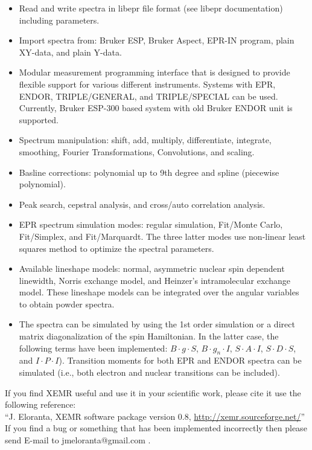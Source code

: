 \documentclass[byrevtex,amssymb,aps,pra,floatfix,letterpaper]{revtex4}
\begin{document}
\begin{itemize}
\item Read and write spectra in libepr file format (see libepr documentation) including parameters.
\item Import spectra from: Bruker ESP, Bruker Aspect, EPR-IN program, plain XY-data, and plain Y-data.
\item Modular measurement programming interface that is designed to provide flexible support for various different instruments. Systems with EPR, ENDOR, TRIPLE/GENERAL, and TRIPLE/SPECIAL can be used. Currently, Bruker ESP-300 based system with old Bruker ENDOR unit is supported.
\item Spectrum manipulation: shift, add, multiply, differentiate, integrate, smoothing, Fourier Transformations, Convolutions, and scaling.
\item Basline corrections: polynomial up to 9th degree and spline (piecewise polynomial).
\item Peak search, cepstral analysis, and cross/auto correlation analysis.
\item EPR spectrum simulation modes: regular simulation, Fit/Monte Carlo, Fit/Simplex, and Fit/Marquardt. The three latter modes use non-linear least squares method to optimize the spectral parameters.
\item Available lineshape models: normal, asymmetric nuclear spin dependent linewidth, Norris exchange model, and Heinzer's intramolecular exchange model.
These lineshape models can be integrated over the angular variables to obtain powder spectra.
\item The spectra can be simulated by using the 1st order simulation or a direct matrix diagonalization of the spin Hamiltonian. In the latter case, the following terms have been implemented: $B\cdot g\cdot S$, $B\cdot g_n\cdot I$, $S\cdot A\cdot I$, $S\cdot D\cdot S$, and $I\cdot P\cdot I$). Transition moments for both EPR and ENDOR spectra can be simulated (i.e., both electron and nuclear transitions can be included).
\end{itemize}

If you find XEMR useful and use it in your scientific work, please cite it use the following reference:\\

\noindent
``J. Eloranta, XEMR software package version 0.8, \url{http://xemr.sourceforge.net/}''\\

\noindent
If you find a bug or something that has been implemented incorrectly then please send E-mail to jmeloranta@gmail.com .
\end{document}
